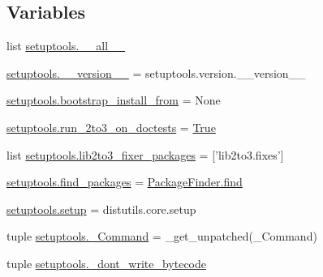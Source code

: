 \subsection*{Variables}
\begin{DoxyCompactItemize}
\item 
list \hyperlink{namespacesetuptools_a4225bf1f017388e9cad84b5c0618a3b0}{setuptools.\+\_\+\+\_\+all\+\_\+\+\_\+}
\item 
\hyperlink{namespacesetuptools_a032cd4f48c18d83d8bb090942751a9cc}{setuptools.\+\_\+\+\_\+version\+\_\+\+\_\+} = setuptools.\+version.\+\_\+\+\_\+version\+\_\+\+\_\+
\item 
\hyperlink{namespacesetuptools_a7d51d85e64a02e0808685340753eec38}{setuptools.\+bootstrap\+\_\+install\+\_\+from} = None
\item 
\hyperlink{namespacesetuptools_a02cbd18fe112cad981fe27383fd1ee93}{setuptools.\+run\+\_\+2to3\+\_\+on\+\_\+doctests} = \hyperlink{libqhull_8h_add3ca9eefe3b5b754426f51d3043e579}{True}
\item 
list \hyperlink{namespacesetuptools_a2a9aa3f4107914fedf47fbf0b6c97620}{setuptools.\+lib2to3\+\_\+fixer\+\_\+packages} = \mbox{[}'lib2to3.\+fixes'\mbox{]}
\item 
\hyperlink{namespacesetuptools_af3f752d8ed43dd0bf1640292cf7f2540}{setuptools.\+find\+\_\+packages} = \hyperlink{array-impl_8h_ad11d57daf4b0db08c441230c60d382be}{Package\+Finder.\+find}
\item 
\hyperlink{namespacesetuptools_a3347a1832befe1bf0e593b4c8bf7c9f8}{setuptools.\+setup} = distutils.\+core.\+setup
\item 
tuple \hyperlink{namespacesetuptools_ae44b3e3d5d0f189812f3afdf135c6514}{setuptools.\+\_\+\+Command} = \+\_\+get\+\_\+unpatched(\+\_\+\+Command)
\item 
tuple \hyperlink{namespacesetuptools_a0c8f1da9f49e958e95cadcd6a44b51c7}{setuptools.\+\_\+dont\+\_\+write\+\_\+bytecode}
\end{DoxyCompactItemize}
